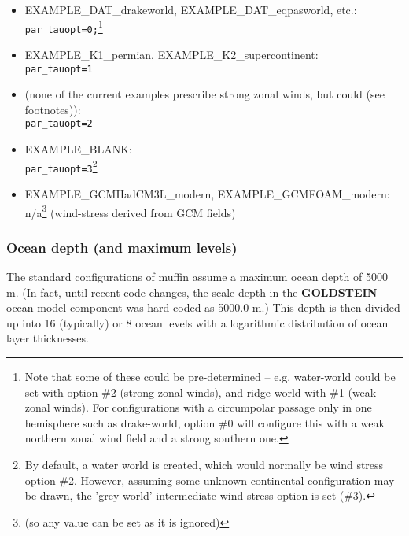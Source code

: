 \documentclass[11pt,fleqn]{book} %
\begin{document}
\vspace{1mm}
\begin{itemize}
\item \textsf{\footnotesize EXAMPLE\_DAT\_drakeworld}, \textsf{\footnotesize EXAMPLE\_DAT\_eqpasworld}, etc.:
\\\texttt{par\_tauopt=0;}\footnote{Note that some of these could be pre-determined -- e.g. water-world could be set with option \#2 (strong zonal winds), and ridge-world with \#1 (weak zonal winds). For configurations with a circumpolar passage only in one hemisphere such as drake-world, option \#0 will configure this with a weak northern zonal wind field and a strong southern one.}
\item \textsf{\footnotesize EXAMPLE\_K1\_permian}, \textsf{\footnotesize EXAMPLE\_K2\_supercontinent}:
\\\texttt{par\_tauopt=1}
\item (none of the current examples prescribe strong zonal winds, but could (see footnotes)):
\\\texttt{par\_tauopt=2}
\item \textsf{\footnotesize EXAMPLE\_BLANK}:
\\\texttt{par\_tauopt=3}\footnote{By default, a water world is created, which would normally be wind stress option \#2. However, assuming some unknown continental configuration may be drawn, the 'grey world' intermediate wind stress option is set (\#3).}
\item \textsf{\footnotesize EXAMPLE\_GCMHadCM3L\_modern}\normalsize, \textsf{\footnotesize EXAMPLE\_GCMFOAM\_modern}\normalsize:
\\n/a\footnote{(so any value can be set as it is ignored)} (wind-stress derived from GCM fields)
\end{itemize}
\vspace{1mm}


\subsubsection{Ocean depth (and maximum levels)}

The standard configurations of muffin assume a maximum ocean depth of 5000 m. (In fact, until recent code changes, the scale-depth in the \textbf{GOLDSTEIN} ocean model component was hard-coded as 5000.0 m.) This depth is then divided up into 16 (typically) or 8 ocean levels with a logarithmic distribution of ocean layer thicknesses.
\end{document}
